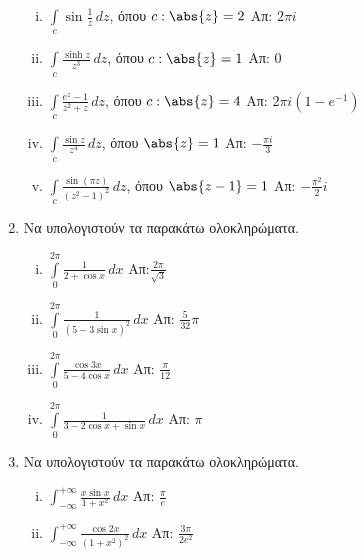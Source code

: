 \begin{enumerate}
    \begin{enumerate}[i)]
      \item $\int\limits_c\sin \frac{1}{z}\,dz$, \quad όπου $c:\abs{z}=2$ 
        \hfill Απ: $2\pi i$
      \item $\int\limits_c\frac{\sinh z}{z^3}\,dz$, \quad όπου $c:\abs{z}=1$ 
        \hfill Απ: $0$
      \item $\int\limits_c\frac{e^z-1}{z^2+z}\,dz$, \quad όπου $c:\abs{z}=4$ 
        \hfill Απ: $2\pi i(1-e^{-1})$
      \item $ \int \limits_{c} \frac{\sin{z}}{z^{4}} \,{dz} $, \quad όπου $ \abs{z}
        =1 $ \hfill Απ: $ - \frac{\pi i}{3} $ 
      \item $ \int \limits_{c} \frac{\sin{(\pi z)}}{(z^{2}-1)^{2}} \,{dz} $, \quad 
        όπου $ \abs{z-1} = 1 $
        \hfill Απ: $ - \frac{\pi ^{2}}{2} i $  
    \end{enumerate}

  \item Να υπολογιστούν τα παρακάτω ολοκληρώματα.

    \begin{enumerate}[i)]
      \item $\int\limits_0^{2\pi}\frac{1}{2+\cos x}\,dx$ \hfill Απ:$\frac{2
        \pi}{\sqrt{3}}$
      \item $\int\limits_0^{2\pi}\frac{1}{(5-3\sin x)^2}\,dx$ \hfill Απ: $\frac{5}{32}\pi$
      \item $\int\limits_0^{2\pi}\frac{\cos 3x}{5-4\cos x}\,dx$ 
        \hfill Απ: $\frac{\pi}{12}$
      \item $\int\limits_0^{2\pi}\frac{1}{3-2\cos x+\sin x}\,dx$ \hfill Απ: $\pi$
    \end{enumerate}

  \item Να υπολογιστούν τα παρακάτω ολοκληρώματα.

    \begin{enumerate}[i)]
      \item $\int_{-\infty}^{+\infty}\frac{x\sin x}{1+x^2}\,dx$ 
        \hfill  Απ: $\frac{\pi}{e}$
      \item $\int_{-\infty}^{+\infty}\frac{\cos 2x}{(1+x^2)^2}\,dx$ 
        \hfill  Απ: $\frac{3\pi}{2e^2}$
    \end{enumerate}
\end{enumerate}


